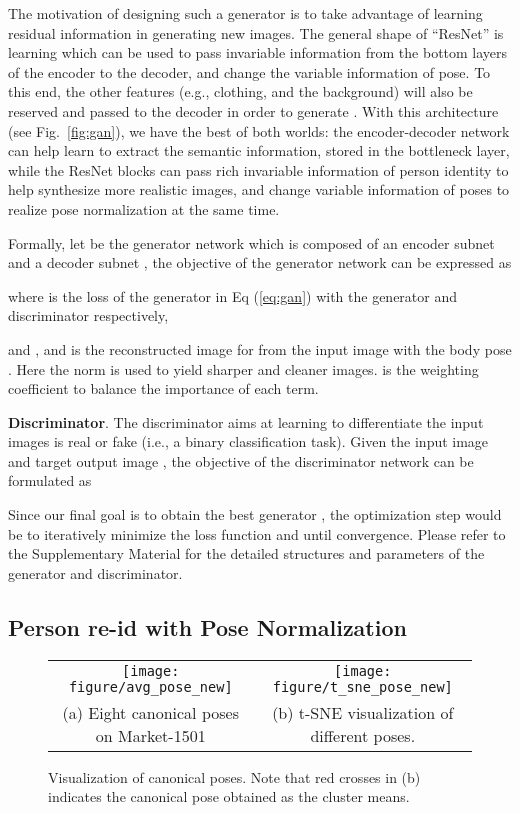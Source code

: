 \documentclass[10pt,letterpaper,twocolumn,10pt,letterpaper,twocolumn]{article}
\providecommand{\tabularnewline}{\\}
\begin{document}
The motivation of designing such a generator is to take advantage
of learning residual information in generating new images. The general
shape of ``ResNet'' is learning  which can be used to
pass invariable information from the bottom layers of the encoder to the decoder,
and change the variable information of pose. To this end, the other
features (e.g., clothing, and the background) will also be reserved
and passed to the decoder in order to generate . With
this architecture (see Fig.~\ref{fig:gan}), we have the best of
both worlds: the encoder-decoder network can help learn to extract
the semantic information, stored in the bottleneck layer, while  the ResNet
blocks can pass rich invariable information of person identity to
help synthesize more realistic images, and change variable information
of poses to realize pose normalization at the same time.

Formally, let  be the generator network
which is composed of an encoder subnet 
and a decoder subnet , the objective of
the generator network can be expressed as 

where  is the loss of the generator in Eq (\ref{eq:gan})
with the generator  and discriminator 
respectively, 


\noindent and ,
and 
is the reconstructed image for  from the input image
 with the body pose .
Here the norm is used to yield sharper and cleaner images.
 is the weighting coefficient to balance the importance
of each term.

\vspace{0.03in}

\noindent \textbf{Discriminator}. The discriminator 
aims at learning to differentiate the input images is real or fake
(i.e., a binary classification task). Given the input image 
and target output image , the objective of the discriminator
network can be formulated as 

Since our final goal is to obtain the best generator , the
optimization step would be to iteratively minimize the loss function
 and  until convergence.
Please refer to the Supplementary Material for the detailed structures
and parameters of the generator and discriminator.

\subsection{Person re-id with Pose Normalization \label{subsec:person-re-id-classification}}

\begin{figure*}
\centering{}\begin{tabular}{cc}
\texttt{[image: figure/avg\_pose\_new]}  & \texttt{[image: figure/t\_sne\_pose\_new]}\tabularnewline
(a) Eight canonical poses on Market-1501  & (b) t-SNE visualization of different poses.\tabularnewline
\end{tabular}\caption{\label{fig:The-eight-poses} Visualization of canonical poses. Note
that red crosses in (b) indicates the canonical pose obtained as the cluster means.}
\end{figure*}
\end{document}
